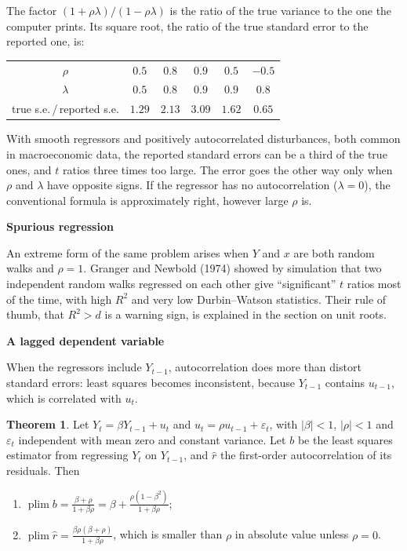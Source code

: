 \documentclass[11pt,a4paper]{article}
\numberwithin{equation}{section}
\DeclareMathOperator{\plim}{plim}
\theoremstyle{definition}
\newtheorem{thm}{Theorem}[subsection]
\newcommand{\subhead}[1]{%
  \par\medskip\noindent\textbf{#1}\par\nobreak\smallskip}
\begin{document}
The factor $(1 + \rho\lambda)/(1 - \rho\lambda)$ is the ratio of the true variance to the one the computer prints. Its square root, the ratio of the true
standard error to the reported one, is:
\begin{center}
\renewcommand{\arraystretch}{1.3}
\begin{tabular}{cccccc}
\hline
$\rho$ & $0.5$ & $0.8$ & $0.9$ & $0.5$ & $-0.5$\\
$\lambda$ & $0.5$ & $0.8$ & $0.9$ & $0.9$ & $0.8$\\
\hline
true s.e.\,/\,reported s.e. & $1.29$ & $2.13$ & $3.09$ & $1.62$ & $0.65$\\
\hline
\end{tabular}
\end{center}
With smooth regressors and positively autocorrelated disturbances, both common in macroeconomic data, the reported standard errors can be a third of
the true ones, and $t$ ratios three times too large. The error goes the other way only when $\rho$ and $\lambda$ have opposite signs. If the regressor has no
autocorrelation ($\lambda = 0$), the conventional formula is approximately right, however large $\rho$ is.

\subhead{Spurious regression}
An extreme form of the same problem arises when $Y$ and $x$ are both random walks and $\rho = 1$. Granger and Newbold (1974) showed by simulation that two
independent random walks regressed on each other give ``significant'' $t$ ratios most of the time, with high $R^2$ and very low Durbin--Watson statistics. Their
rule of thumb, that $R^2 > d$ is a warning sign, is explained in the section on unit roots.

\subhead{A lagged dependent variable}
When the regressors include $Y_{t-1}$, autocorrelation does more than distort standard errors: least squares becomes inconsistent, because $Y_{t-1}$
contains $u_{t-1}$, which is correlated with $u_t$.

\begin{thm}
\label{thm:lagdep}
Let $Y_t = \beta Y_{t-1} + u_t$ and $u_t = \rho u_{t-1} + \varepsilon_t$, with $|\beta| < 1$, $|\rho| < 1$ and $\varepsilon_t$ independent with mean zero and constant
variance. Let $b$ be the least squares estimator from regressing $Y_t$ on $Y_{t-1}$, and $\hat r$ the first-order autocorrelation of its residuals. Then
\begin{enumerate}[label=(\roman*)]
\item $\displaystyle\plim b = \frac{\beta + \rho}{1 + \beta\rho} = \beta + \frac{\rho(1 - \beta^2)}{1 + \beta\rho}$;
\item $\displaystyle\plim \hat r = \frac{\beta\rho(\beta + \rho)}{1 + \beta\rho}$, which is smaller than $\rho$ in absolute value unless $\rho = 0$.
\end{enumerate}
\end{thm}
\end{document}
